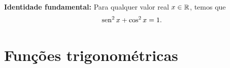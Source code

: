 


\begin{obs}
    \textbf{Identidade fundamental:} Para qualquer valor real $x\in \mathbb{R}$, temos que
    \begin{equation*}
        \operatorname{sen}^2 x +\cos^2 x = 1.
    \end{equation*}
\end{obs}






\section{Funções trigonométricas}
   
